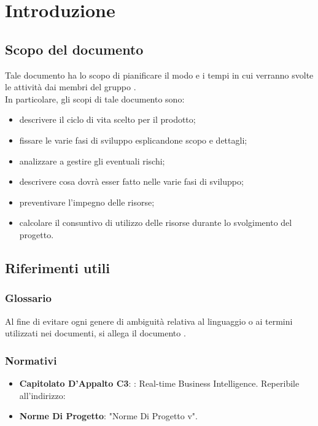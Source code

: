 \section{Introduzione}
	\subsection{Scopo del documento}
		Tale documento ha lo scopo di pianificare il modo e i tempi in cui verranno svolte le attività dai membri del gruppo \groupname{}. \\In particolare, gli scopi di tale documento sono:
		\begin{itemize}
			\item descrivere il ciclo di vita scelto per il prodotto;
			\item fissare le varie fasi di sviluppo esplicandone scopo e dettagli;
			\item analizzare a gestire gli eventuali rischi;
			\item descrivere cosa dovrà esser fatto nelle varie fasi di sviluppo;
			\item preventivare l'impegno delle risorse;
			\item calcolare il consuntivo di utilizzo delle risorse durante lo svolgimento del progetto.
		\end{itemize}
	\subsection{Riferimenti utili}
		\subsubsection{Glossario}
		Al fine di evitare ogni genere di ambiguità relativa al linguaggio o ai termini utilizzati nei documenti, si allega il documento .
		\subsubsection{Normativi}
			\begin{itemize}
				\item\textbf{Capitolato D'Appalto C3}: \projectname{}: Real-time Business Intelligence. Reperibile all'indirizzo: 
				\item\textbf{Norme Di Progetto}: "Norme Di Progetto v\lastversion{}".
			\end{itemize}
